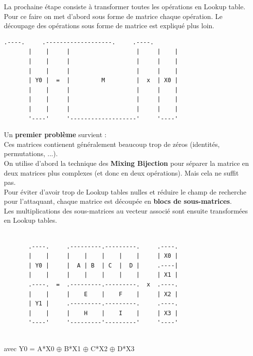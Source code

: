 \documentclass[a4paper,12pt]{article}
\begin{document}
La prochaine étape consiste à transformer toutes les opérations en Lookup table. Pour ce faire on met d'abord sous forme de matrice chaque opération. Le découpage des opérations sous forme de matrice est expliqué plus loin.\\


\begin{Verbatim}[samepage=true]
       .----.     .-------------------.     .----.
       |    |     |                   |     |    |
       |    |     |                   |     |    |
       |    |     |                   |     |    |
       | Y0 |  =  |         M         |  x  | X0 |
       |    |     |                   |     |    |
       |    |     |                   |     |    |
       |    |     |                   |     |    |
       '----'     '-------------------'     '----'

\end{Verbatim}

Un \textbf{premier problème} survient :\\

Ces matrices contienent généralement beaucoup trop de zéros (identités, permutations, ...).\\
On utilise d'abord la technique des \textbf{Mixing Bijection} pour séparer la matrice en deux matrices plus complexes (et donc en deux opérations). Mais cela ne suffit pas.\\
Pour éviter d'avoir trop de Lookup tables nulles et réduire le champ de recherche pour l'attaquant, chaque matrice est découpée en \textbf{blocs de sous-matrices}.\\
Les multiplications des sous-matrices au vecteur associé sont ensuite transformées en Lookup tables.\\

\begin{Verbatim}[samepage=true]

       .----.     .---------.---------.     .----.
       |    |     |    |    |    |    |     | X0 |
       | Y0 |     |  A | B  | C  |  D |     .----|
       |    |     |    |    |    |    |     | X1 |
       .----.  =  .---------.---------.  x  .----.
       |    |     |    E    |    F    |     | X2 |
       | Y1 |     .---------.---------.     .----.
       |    |     |    H    |    I    |     | X3 |
       '----'     '---------'---------'     '----'
           
\end{Verbatim}

avec Y0 = A*X0 $\oplus$ B*X1 $\oplus$ C*X2 $\oplus$ D*X3
\end{document}
